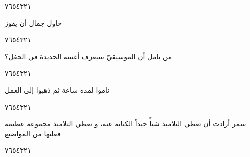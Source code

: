 \documentclass[11pt, a4paper]{article}
\begin{document}
{\begin{center}
        \hfill\textarabic{٧}\hfill\textarabic{٦}\hfill\textarabic{٥}\hfill\textarabic{٤}\hfill\textarabic{٣}\hfill\textarabic{٢}\hfill\textarabic{١}
        \end{center}


\vspace{0.5\baselineskip}\begin{flushright}
\textarabic{حاول جمال أن يفوز}
\end{flushright}

\begin{center}
        \hfill\textarabic{٧}\hfill\textarabic{٦}\hfill\textarabic{٥}\hfill\textarabic{٤}\hfill\textarabic{٣}\hfill\textarabic{٢}\hfill\textarabic{١}
        \end{center}


\vspace{0.5\baselineskip}\begin{flushright}
\textarabic{من يأمل أن الموسيقيّ سيعزف أغنيته الجديدة في الحفل؟}
\end{flushright}

\begin{center}
        \hfill\textarabic{٧}\hfill\textarabic{٦}\hfill\textarabic{٥}\hfill\textarabic{٤}\hfill\textarabic{٣}\hfill\textarabic{٢}\hfill\textarabic{١}
        \end{center}

\vfill\clearpage

\vspace{0.5\baselineskip}\begin{flushright}
\textarabic{ناموا لمدة ساعة ثم ذهبوا إلى العمل}
\end{flushright}

\begin{center}
        \hfill\textarabic{٧}\hfill\textarabic{٦}\hfill\textarabic{٥}\hfill\textarabic{٤}\hfill\textarabic{٣}\hfill\textarabic{٢}\hfill\textarabic{١}
        \end{center}


\vspace{0.5\baselineskip}\begin{flushright}
\textarabic{سمر أرادت أن تعطي التلاميذ شيأً جيداً الكتابة عنه، و تعطي التلاميذ مجموعة عظيمة فعلتها من المواضيع}
\end{flushright}

\begin{center}
        \hfill\textarabic{٧}\hfill\textarabic{٦}\hfill\textarabic{٥}\hfill\textarabic{٤}\hfill\textarabic{٣}\hfill\textarabic{٢}\hfill\textarabic{١}
        \end{center}


}
\end{document}
